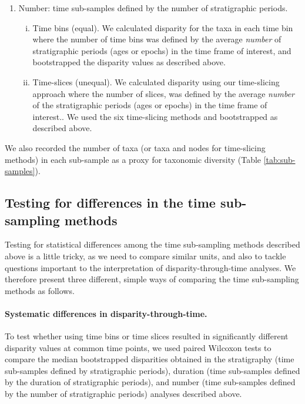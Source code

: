 \documentclass[12pt,a4paper]{article}
\begin{document}
\begin{enumerate}
  \item Number: time sub-samples defined by the number of stratigraphic periods. 
  \begin{enumerate}[(i)]
    \item Time bins (equal). 
    We calculated disparity for the taxa in each time bin where the number of time bins was defined by the average \textit{number} of stratigraphic periods (ages or epochs) in the time frame of interest, and bootstrapped the disparity values as described above.
    \item Time-slices (unequal).
    We calculated disparity using our time-slicing approach where the number of slices, was defined by the average \textit{number} of the stratigraphic periods (ages or epochs) in the time frame of interest..
    We used the six time-slicing methods and bootstrapped as described above.
  \end{enumerate}

\end{enumerate}

We also recorded the number of taxa (or taxa and nodes for time-slicing methods) in each sub-sample as a proxy for taxonomic diversity (Table \ref{tab:sub-samples}).


\subsection{Testing for differences in the time sub-sampling methods}
\label{testing}
Testing for statistical differences among the time sub-sampling methods described above is a little tricky, as we need to compare similar units, and also to tackle questions important to the interpretation of disparity-through-time analyses. 
We therefore present three different, simple ways of comparing the time sub-sampling methods as follows.

\paragraph{Systematic differences in disparity-through-time.} 
To test whether using time bins or time slices resulted in significantly different disparity values at common time points, we used paired Wilcoxon tests to compare the median bootstrapped disparities obtained in the stratigraphy (time sub-samples defined by stratigraphic periods), duration (time sub-samples defined by the duration of stratigraphic periods), and number (time sub-samples defined by the number of stratigraphic periods) analyses described above.
\end{document}
